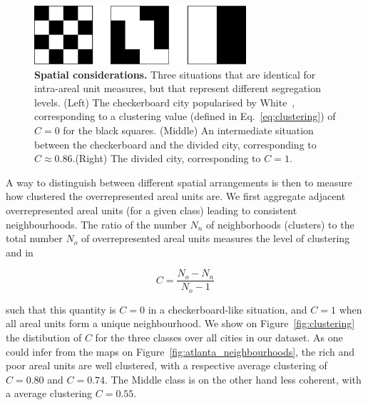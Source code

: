 \begin{figure}[!h]
    \centering
    \includegraphics[width=0.7\textwidth]{./gfx/chapter-segregation/figure5.pdf}
    \caption{{\bf Spatial considerations.} Three situations that are identical for intra-areal unit measures,
        but that represent different segregation levels. (Left) The checkerboard
        city popularised by White~\cite{White:1983}, corresponding to a
        clustering value (defined in Eq.~\ref{eq:clustering}) of $C=0$ for the black squares. (Middle) An
        intermediate situation between the checkerboard and the divided city,
        corresponding to $C \approx 0.86$.(Right) The divided city, corresponding to
        $C=1$. \label{fig:checkerboard}} 
\end{figure}


A way to distinguish between different spatial arrangements is then to measure
how clustered the overrepresented areal units are. We first aggregate adjacent
overrepresented areal units (for a given class) leading to consistent
neighbourhoods. The ratio of the number $N_n$ of neighborhoods (clusters) to the
total number $N_o$ of overrepresented areal units measures the level of
clustering and in 

\begin{equation} 
    C = \frac{N_{o}-N_{n}}{N_{o}-1}
    \label{eq:clustering}
\end{equation}


such that this quantity is $C = 0$ in a checkerboard-like situation, and $C = 1$
when all areal units form a unique neighbourhood. We show on
Figure~\ref{fig:clustering} the distibution of $C$ for the three classes over all
cities in our dataset. As one could infer from the maps on
Figure~\ref{fig:atlanta_neighbourhoods}, the rich and poor areal units are well
clustered, with a respective average clustering of $C = 0.80$ and $C = 0.74$.
The Middle class is on the other hand less coherent, with a average clustering
$C = 0.55$.\\


